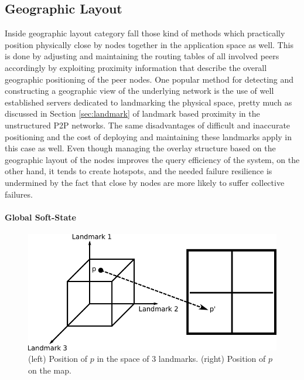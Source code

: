 \documentclass[acmcsur,acmnow]{acmtrans2m}
\begin{document}

\subsection{Geographic Layout}

Inside geographic layout category fall those kind of methods which practically position physically close by nodes together in the application space as well. This is done by adjusting and maintaining the routing tables of all involved peers accordingly by exploiting proximity information that describe the overall geographic positioning of the peer nodes. One popular method for detecting and constructing a geographic view of the underlying network is the use of well established servers dedicated to landmarking the physical space, pretty much as discussed in Section \ref{sec:landmark} of landmark based proximity in the unstructured P2P networks. The same disadvantages of difficult and inaccurate positioning and the cost of deploying and maintaining these landmarks apply in this case as well.
Even though managing the overlay structure based on the geographic layout of the nodes improves the query efficiency of the system, on the other hand, it tends to create hotspots, and the needed failure resilience is undermined by the fact that close by nodes are more likely to suffer collective failures.

\paragraph*{\bf Global Soft-State}

\begin{figure}
\centering
  \includegraphics[scale=0.8]{img/algorithms/global_softstate}
\caption{(left) Position of $p$ in the space of $3$ landmarks. (right) Position of $p$ on the map.}
\label{fig:global_softstate}
\end{figure}
\end{document}
